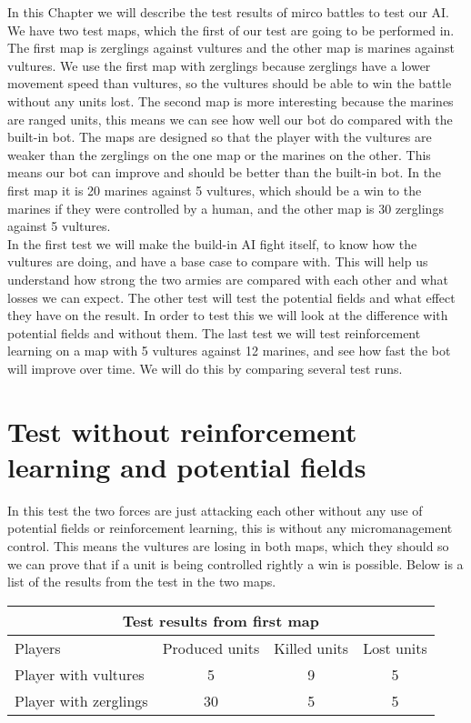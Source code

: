 In this Chapter we will describe the test results of mirco battles to test our AI. We have two test maps, which the first of our test are going to be performed in. The first map is  zerglings against vultures and the other map is marines against vultures. We use the first map with zerglings because zerglings have a lower movement speed than vultures, so the vultures should be able to win the battle without any units lost. The second map is more interesting because the marines are ranged units, this means we can see how well our bot do compared with the built-in bot. The maps are  designed so that the player with the vultures are weaker than the zerglings on the one map or the marines on the other. This means our bot can improve and should be better than the built-in bot. In the first map it is 20 marines against 5 vultures, which should be a win to the marines if they were controlled by a human, and the other map is 30 zerglings against 5 vultures. \\


In the first test we will make the build-in AI fight itself, to know how the vultures are doing, and have a base case to compare with. This will help us understand how strong the two armies are compared with each other and what losses we can expect. The other test will test the potential fields and what effect they have on the result.
In order to test this we will look at the difference with potential fields and without them. The last test we will test reinforcement learning on a map with 5 vultures against 12 marines, and see how fast the bot will improve over time. We will do this by comparing several test runs.

\section{Test without reinforcement learning and potential fields} %
In this test the two forces are just attacking each other without any use of potential fields or reinforcement learning, this is without any micromanagement control. This means the vultures are losing in both maps, which they should so we can prove that if a unit is being controlled rightly a win is possible. Below is a list of the results from the test in the two maps.\\

\begin{centering}
 \begin{tabular}{|l|c|c|c|}
	\multicolumn{4}{c}{Test results from first map} \\
	\hline
		Players & Produced units & Killed units & Lost units\\
	\hline
	\hline
		Player with vultures & 5 & 9 & 5 \\
	\hline
		Player with zerglings & 30 & 5 & 5\\
	\hline

\end{tabular}
\end{centering}
\newpage

